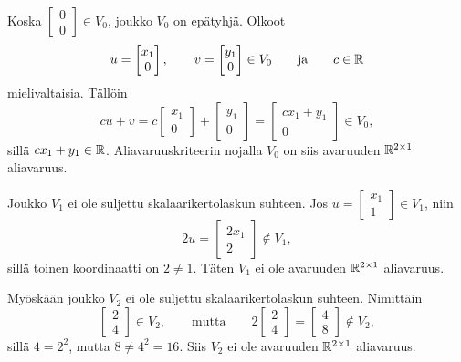 \documentclass[11pt,a4paper]{amsart}
\begin{document}
\begin{solution}
  Koska \(
    \begin{bmatrix}0 \\ 0
  \end{bmatrix}\in V_0\), joukko
  \(V_0\) on epätyhjä. Olkoot
  \[
    u =
    \begin{bmatrix}x_1 \\ 0
    \end{bmatrix},
    \qquad
    v =
    \begin{bmatrix}y_1 \\ 0
    \end{bmatrix}
    \in V_0
    \qquad\text{ja}\qquad c\in\mathbb{R}
  \]
  mielivaltaisia. Tällöin
  \[
    cu+v
    = c
    \begin{bmatrix}x_1 \\ 0
    \end{bmatrix}
    +
    \begin{bmatrix}y_1 \\ 0
    \end{bmatrix}
    =
    \begin{bmatrix}cx_1+y_1 \\ 0
    \end{bmatrix}
    \in V_0,
  \]
  sillä \(cx_1+y_1\in\mathbb{R}\). Aliavaruuskriteerin nojalla \(V_0\)
  on siis avaruuden \(\mathbb{R}^{2\times 1}\) aliavaruus.

  Joukko \(V_1\) ei ole suljettu skalaarikertolaskun suhteen.
  Jos \(u=
    \begin{bmatrix}x_1 \\ 1
  \end{bmatrix}\in V_1\), niin
  \[
    2u =
    \begin{bmatrix}2x_1 \\ 2
    \end{bmatrix}\notin V_1,
  \]
  sillä toinen koordinaatti on \(2\neq 1\). Täten \(V_1\) ei ole
  avaruuden \(\mathbb{R}^{2\times 1}\) aliavaruus.

  Myöskään joukko \(V_2\) ei ole suljettu skalaarikertolaskun
  suhteen. Nimittäin
  \[
    \begin{bmatrix}2 \\ 4
    \end{bmatrix}\in V_2,
    \qquad\text{mutta}\qquad
    2
    \begin{bmatrix}2 \\ 4
    \end{bmatrix}
    =
    \begin{bmatrix}4 \\ 8
    \end{bmatrix}\notin V_2,
  \]
  sillä \(4=2^2\), mutta \(8\neq 4^2=16\). Siis \(V_2\) ei ole
  avaruuden \(\mathbb{R}^{2\times 1}\) aliavaruus.
\end{solution}
\end{document}
